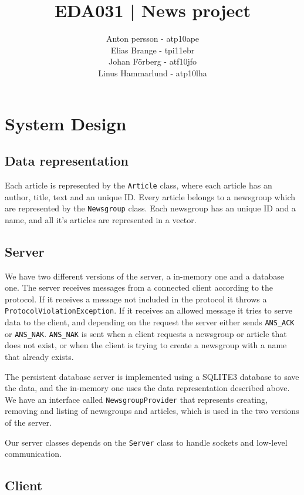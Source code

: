 \documentclass[12pt]{article}
\title{EDA031 | News project}
\author{Anton persson - atp10ape\\
		Elias Brange - tpi11ebr\\
		Johan Förberg - atf10jfo\\
		Linus Hammarlund - atp10lha}
\begin{document}
\maketitle
\newpage

\section{System Design}

\subsection{Data representation}
Each article is represented by the \verb!Article! class, where each article has an author, title, text and an unique ID. Every article belongs to a newsgroup which are represented by the \verb!Newsgroup! class. Each newsgroup has an unique ID and a name, and all it's articles are represented in a vector.

\subsection{Server}
We have two different versions of the server, a in-memory one and a database one. The server receives messages from a connected client according to the protocol. If it receives a message not included in the protocol it throws a \verb!ProtocolViolationException!. If it receives an allowed message it tries to serve data to the client, and depending on the request the server either sends \verb!ANS_ACK! or \verb!ANS_NAK!. \verb!ANS_NAK! is sent when a client requests a newsgroup or article that does not exist, or when the client is trying to create a newsgroup with a name that already exists.

The persistent database server is implemented using a SQLITE3 database to save the data, and the in-memory one uses the data representation described above. We have an interface called \verb!NewsgroupProvider! that represents creating, removing and listing of newsgroups and articles, which is used in the two versions of the server.

Our server classes depends on the \verb!Server! class to handle sockets and low-level communication.

\subsection{Client}
\end{document}
